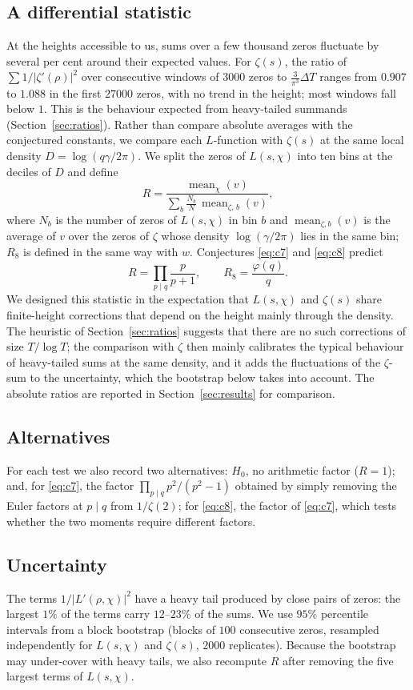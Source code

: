 \documentclass[11pt]{amsart}
\newcommand{\Lp}{L'}
\DeclareMathOperator{\med}{mean}
\begin{document}
\subsection{A differential statistic}
At the heights accessible to us, sums over a few thousand zeros fluctuate by several per cent around their expected
values. For $\zeta(s)$, the ratio of $\sum 1/|\zeta'(\rho)|^2$ over consecutive windows of $3000$ zeros to
$\frac{3}{\pi^3}\Delta T$ ranges from $0.907$ to $1.088$ in the first $27000$ zeros, with no trend in the height; most
windows fall below $1$. This is the behaviour expected from heavy-tailed summands (Section~\ref{sec:ratios}). Rather
than compare absolute averages with the conjectured constants, we compare each $L$-function with $\zeta(s)$ at the
same local density $D=\log(q\gamma/2\pi)$. We split the zeros of $L(s,\chi)$ into ten bins at the
deciles of $D$ and define
\[
R=\frac{\med_{\chi}(v)}{\sum_{b}\frac{N_b}{N}\,\med_{\zeta,\,b}(v)},
\]
where $N_b$ is the number of zeros of $L(s,\chi)$ in bin $b$ and $\med_{\zeta,b}(v)$ is the average of $v$ over the
zeros of $\zeta$ whose density $\log(\gamma/2\pi)$ lies in the same bin; $R_8$ is defined in the same way with $w$.
Conjectures \eqref{eq:c7} and \eqref{eq:c8} predict
\[
R=\prod_{p\mid q}\frac{p}{p+1},\qquad R_8=\frac{\varphi(q)}{q}.
\]
We designed this statistic in the expectation that $L(s,\chi)$ and $\zeta(s)$ share finite-height corrections that
depend on the height mainly through the density. The heuristic of Section~\ref{sec:ratios} suggests that there are no
such corrections of size $T/\log T$; the comparison with $\zeta$ then mainly calibrates the typical behaviour of
heavy-tailed sums at the same density, and it adds the fluctuations of the $\zeta$-sum to the uncertainty, which the
bootstrap below takes into account. The absolute ratios are reported in Section~\ref{sec:results} for comparison.

\subsection{Alternatives}
For each test we also record two alternatives: $H_0$, no arithmetic factor ($R=1$); and, for \eqref{eq:c7}, the
factor $\prod_{p\mid q}p^2/(p^2-1)$ obtained by simply removing the Euler factors at $p\mid q$ from $1/\zeta(2)$; for
\eqref{eq:c8}, the factor of \eqref{eq:c7}, which tests whether the two moments require different factors.

\subsection{Uncertainty}
The terms $1/|\Lp(\rho,\chi)|^{2}$ have a heavy tail produced by close pairs of zeros: the largest $1\%$ of the terms
carry $12$--$23\%$ of the sums. We use $95\%$ percentile intervals from a block bootstrap (blocks of $100$ consecutive
zeros, resampled independently for $L(s,\chi)$ and $\zeta(s)$, $2000$ replicates). Because the bootstrap may
under-cover with heavy tails, we also recompute $R$ after removing the five largest terms of $L(s,\chi)$.
\end{document}
